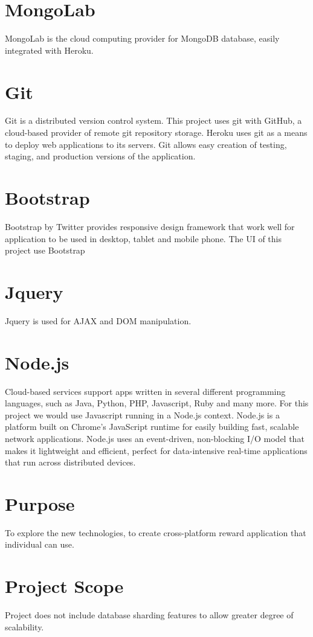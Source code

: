 \section{MongoLab}
MongoLab is the cloud computing provider for MongoDB database, easily integrated with Heroku.

\section{Git}
Git is a distributed version control system.  This project uses git with GitHub, a cloud-based provider of remote git repository storage.  Heroku uses git as a means to deploy web applications to its servers. Git allows easy creation of testing, staging, and production versions of the application. 

\section{Bootstrap}
Bootstrap by Twitter provides responsive design framework that work well for application to be used in desktop, tablet and mobile phone. The UI of this project use Bootstrap  

\section{Jquery}
Jquery is used for AJAX and DOM manipulation.

\section{Node.js}
Cloud-based services support apps written in several different programming languages, such as Java, Python, PHP, Javascript, Ruby and many more. For this project we would use Javascript running in a Node.js context. Node.js is a platform built on Chrome's JavaScript runtime for easily building fast, scalable network applications. Node.js uses an event-driven, non-blocking I/O model that makes it lightweight and efficient, perfect for data-intensive real-time applications that run across distributed devices.

\section{Purpose}
To explore the new technologies, to create cross-platform reward application that individual can use.

\section{Project Scope}
Project does not include database sharding features to allow greater degree of scalability. 

